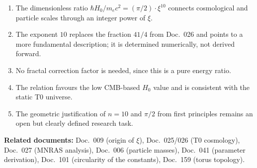 \begin{foundation}
    \begin{enumerate}
        \item The dimensionless ratio
              $\hbar H_0 / m_e c^2 = (\pi/2) \cdot \xi^{10}$ connects
              cosmological and particle scales through an integer
              power of $\xi$.
        \item The exponent $10$ replaces the fraction $41/4$ from Doc.~026
              and points to a more fundamental description; it is
              determined numerically, not derived forward.
        \item No fractal correction factor is needed, since this is a
              pure energy ratio.
        \item The relation favours the low CMB-based
              $H_0$ value and is consistent with the static
              T0 universe.
        \item The geometric justification of $n = 10$ and $\pi/2$ from
              first principles remains an open but
              clearly defined research task.
    \end{enumerate}
\end{foundation}

\vspace{1.5em}

\noindent\textbf{Related documents:}
Doc.~009 (origin of $\xi$),
Doc.~025/026 (T0 cosmology),
Doc.~027 (MNRAS analysis),
Doc.~006 (particle masses),
Doc.~041 (parameter derivation),
Doc.~101 (circularity of the constants),
Doc.~159 (torus topology).
